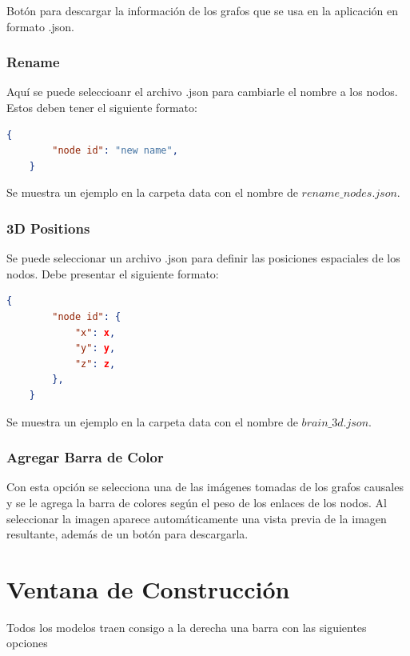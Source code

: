 \documentclass[spanish]{article}
\begin{document}
Botón para descargar la información de los grafos que se usa en la aplicación en formato .json.


\subsubsection*{Rename}

Aquí se puede seleccioanr el archivo .json para cambiarle el nombre a los nodos. Estos deben tener el siguiente formato:

\begin{lstlisting}[language=json,firstnumber=1]
    {
        "node id": "new name",
    }
\end{lstlisting}

Se muestra un ejemplo en la carpeta data con el nombre de $rename\_nodes.json$.


\subsubsection*{3D Positions}

Se puede seleccionar un archivo .json para definir las posiciones espaciales de los nodos. Debe presentar el siguiente formato:

\begin{lstlisting}[language=json,firstnumber=1]
    {
        "node id": {
            "x": x,
            "y": y,
            "z": z,
        },
    }
\end{lstlisting}

Se muestra un ejemplo en la carpeta data con el nombre de $brain\_3d.json$.\\


\subsubsection*{Agregar Barra de Color}

Con esta opción se selecciona una de las imágenes tomadas de los grafos causales y se le agrega la barra de colores según el peso de los enlaces de los nodos. Al seleccionar la imagen aparece automáticamente una vista previa de la imagen resultante, además de un botón para descargarla.


\section*{Ventana de Construcción}

Todos los modelos traen consigo a la derecha una barra con las siguientes opciones
\end{document}
